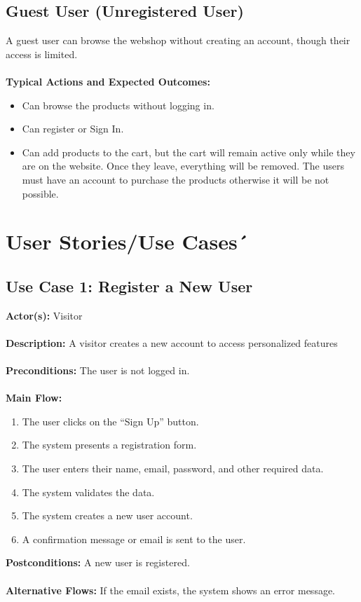 \documentclass[a4paper,12pt]{article}
\begin{document}
	\subsection*{Guest User (Unregistered User)}
	A guest user can browse the webshop without creating an account, though their access is limited. \\ \\
	\textbf{Typical Actions and Expected Outcomes:}
	\begin{itemize}
		\item Can browse the products without logging in.
		\item Can register or Sign In.
		\item Can add products to the cart, but the cart will remain active only while they are on the website. Once they leave, everything will be removed. The users must have an account to purchase the products otherwise it will be not possible.
	\end{itemize}
	\section{User Stories/Use Cases´}
	\subsection*{Use Case 1: Register a New User}
	\textbf{Actor(s):} Visitor \\ \\
	\textbf{Description:} A visitor creates a new account to access personalized features \\ \\
	\textbf{Preconditions:} The user is not logged in. \\ \\
	\textbf{Main Flow:}
	\begin{enumerate}
    		\item The user clicks on the ``Sign Up'' button.
    		\item The system presents a registration form.
    		\item The user enters their name, email, password, and other required data.
    		\item The system validates the data.
    		\item The system creates a new user account.
    		\item A confirmation message or email is sent to the user.
    \end{enumerate}
    \textbf{Postconditions:} A new user is registered. \\ \\
    \textbf{Alternative Flows:} If the email exists, the system shows an error message.
\end{document}
